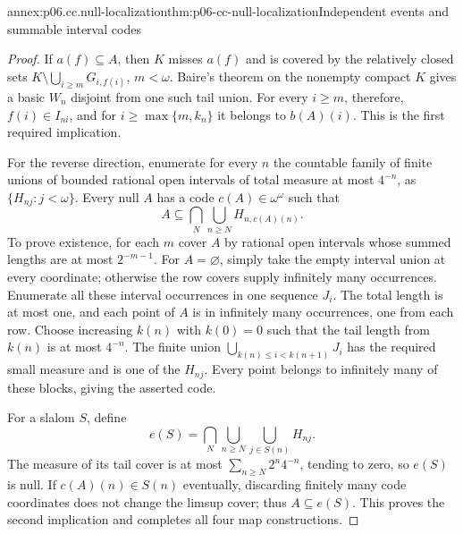 \begin{annexitem}{annex:p06.cc.null-localization}{thm:p06-cc-null-localization}{Independent events and summable interval codes}
\begin{proof}
If \(a(f)\subseteq A\), then \(K\) misses \(a(f)\) and is covered
by the relatively closed sets
\(K\setminus\bigcup_{i\geq m}G_{i,f(i)}\), \(m<\omega\).
Baire's theorem on the nonempty compact \(K\) gives a basic \(W_n\)
disjoint from one such tail union. For every \(i\geq m\), therefore,
\(f(i)\in I_{ni}\), and for \(i\geq\max\{m,k_n\}\) it belongs
to \(b(A)(i)\). This is the first required implication.

For the reverse direction, enumerate for every \(n\) the countable
family of finite unions of bounded rational open intervals of total
measure at most \(4^{-n}\), as \(\{H_{nj}:j<\omega\}\).
Every null \(A\) has a code \(c(A)\in\omega^\omega\) such that
\[
 A\subseteq\bigcap_N\bigcup_{n\geq N}H_{n,c(A)(n)}.
\]
To prove existence, for each \(m\) cover \(A\) by rational open
intervals whose summed lengths are at most \(2^{-m-1}\).
For \(A=\varnothing\), simply take the empty interval union at every
coordinate; otherwise the row covers supply infinitely many occurrences.
Enumerate all these interval occurrences in one sequence \(J_i\).
The total length is at most one, and each point of \(A\) is in
infinitely many occurrences, one from each row. Choose increasing
\(k(n)\) with \(k(0)=0\) such that the tail length from \(k(n)\)
is at most \(4^{-n}\). The finite union
\(\bigcup_{k(n)\leq i<k(n+1)}J_i\) has the required small measure
and is one of the \(H_{nj}\). Every point belongs to infinitely many
of these blocks, giving the asserted code.

For a slalom \(S\), define
\[
 e(S)=\bigcap_N\bigcup_{n\geq N}\bigcup_{j\in S(n)}H_{nj}.
\]
The measure of its tail cover is at most
\(\sum_{n\geq N}2^n4^{-n}\), tending to zero, so \(e(S)\) is null.
If \(c(A)(n)\in S(n)\) eventually, discarding finitely many code
coordinates does not change the limsup cover; thus \(A\subseteq e(S)\).
This proves the second implication and completes all four map constructions.
\end{proof}
\end{annexitem}


